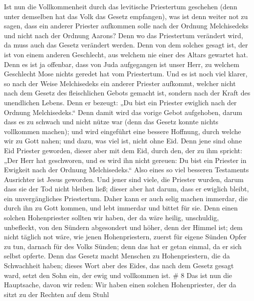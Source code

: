  Ist nun die Vollkommenheit durch das levitische
Priestertum geschehen (denn unter demselben hat das Volk das Gesetz
empfangen), was ist denn weiter not zu sagen, dass ein anderer Priester
aufkommen solle nach der Ordnung Melchisedeks und nicht nach der Ordnung
Aarons?  Denn wo das Priestertum verändert wird, da muss
auch das Gesetz verändert werden.  Denn von dem solches
gesagt ist, der ist von einem anderen Geschlecht, aus welchem nie einer
des Altars gewartet hat.  Denn es ist ja offenbar, dass von
Juda aufgegangen ist unser Herr, zu welchem Geschlecht Mose nichts
geredet hat vom Priestertum.  Und es ist noch viel klarer,
so nach der Weise Melchisedeks ein anderer Priester aufkommt,
 welcher nicht nach dem Gesetz des fleischlichen Gebots
gemacht ist, sondern nach der Kraft des unendlichen Lebens.
 Denn er bezeugt: „Du bist ein Priester ewiglich nach der
Ordnung Melchisedeks.``  Denn damit wird das vorige Gebot
aufgehoben, darum dass es zu schwach und nicht nütze war 
(denn das Gesetz konnte nichts vollkommen machen); und wird eingeführt
eine bessere Hoffnung, durch welche wir zu Gott nahen;  und
dazu, was viel ist, nicht ohne Eid. Denn jene sind ohne Eid Priester
geworden,  dieser aber mit dem Eid, durch den, der zu ihm
spricht: „Der Herr hat geschworen, und es wird ihn nicht gereuen: Du
bist ein Priester in Ewigkeit nach der Ordnung Melchisedeks.``
 Also eines so viel besseren Testaments Ausrichter ist
Jesus geworden.  Und jener sind viele, die Priester wurden,
darum dass sie der Tod nicht bleiben ließ;  dieser aber hat
darum, dass er ewiglich bleibt, ein unvergängliches Priestertum.
 Daher kann er auch selig machen immerdar, die durch ihn zu
Gott kommen, und lebt immerdar und bittet für sie.  Denn
einen solchen Hohenpriester sollten wir haben, der da wäre heilig,
unschuldig, unbefleckt, von den Sündern abgesondert und höher, denn der
Himmel ist;  dem nicht täglich not wäre, wie jenen
Hohenpriestern, zuerst für eigene Sünden Opfer zu tun, darnach für des
Volks Sünden; denn das hat er getan einmal, da er sich selbst opferte.
 Denn das Gesetz macht Menschen zu Hohenpriestern, die da
Schwachheit haben; dieses Wort aber des Eides, das nach dem Gesetz
gesagt ward, setzt den Sohn ein, der ewig und vollkommen ist. \# 8
 Das ist nun die Hauptsache, davon wir reden: Wir haben
einen solchen Hohenpriester, der da sitzt zu der Rechten auf dem Stuhl

